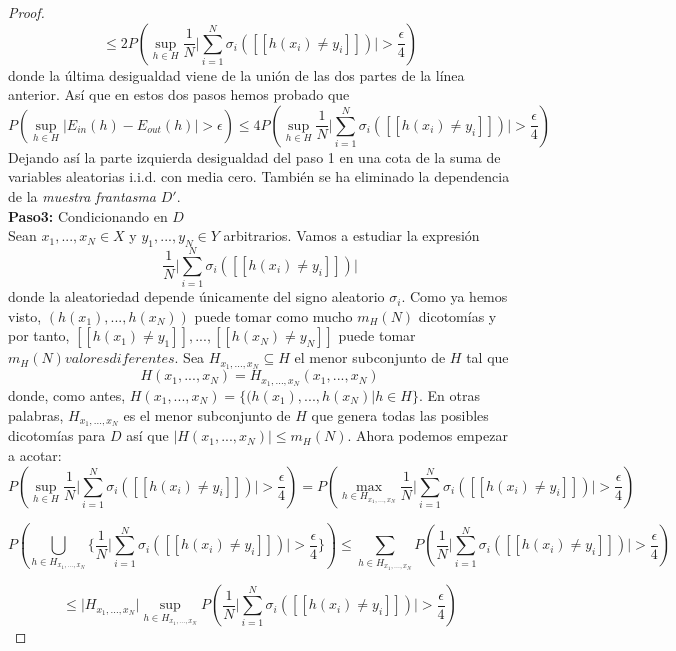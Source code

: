 \begin{proof}
\[ \leq 2P \left( \sup_{h \in H} \frac{1}{N} \bigg\vert \sum_{i=1}^{N} \sigma_{i} ( [[ h(x_{i}) \neq y_{i} ]])\bigg\vert > \frac{\epsilon}{4} \right)\]
donde la última desigualdad viene de la unión de las dos partes de la línea anterior. Así que en estos dos pasos hemos probado que
\[ P \left( \sup_{h \in H} \vert E_{in}(h)-E_{out}(h) \vert >\epsilon \right) \leq 4P \left( \sup_{h \in H} \frac{1}{N} \bigg\vert \sum_{i=1}^{N} \sigma_{i} ( [[ h(x_{i}) \neq y_{i} ]])\bigg\vert > \frac{\epsilon}{4} \right) \]
Dejando así la parte izquierda desigualdad del paso 1 en una cota de la suma de variables aleatorias i.i.d. con media cero. También se ha eliminado la dependencia de la \textit{muestra frantasma} $D'$.\\ 
\textbf{Paso3:} Condicionando en $D$\\
Sean $x_{1},...,x_{N} \in X$ y $y_{1},...,y_{N} \in Y$ arbitrarios. Vamos a estudiar la expresión
\[ \frac{1}{N} \bigg\vert \sum_{i=1}^{N} \sigma_{i} ( [[ h(x_{i}) \neq y_{i} ]])\bigg\vert \]
donde la aleatoriedad depende únicamente del signo aleatorio $\sigma_{i}$. Como ya hemos visto, $(h(x_{1}),..., h(x_{N}))$ puede tomar como mucho $m_{H}(N)$ dicotomías y por tanto, $[[ h(x_{1}) \neq y_{1} ]],...,[[ h(x_{N}) \neq y_{N} ]]$ puede tomar $m_{H}(N) valores diferentes$. Sea $H_{x_{1},...,x_{N}} \subseteq H$ el menor subconjunto de $H$ tal que
\[ H(x_{1},...,x_{N})=H_{x_{1},...,x_{N}}(x_{1},...,x_{N}) \]
donde, como antes, $H(x_{1},...,x_{N})= \lbrace (h(x_{1}),...,h(x_{N}) \vert h \in H \rbrace$. En otras palabras, $H_{x_{1},...,x_{N}}$ es el menor subconjunto de $H$ que genera todas las posibles dicotomías para $D$ así que $\vert H(x_{1},...,x_{N}) \vert \leq m_{H}(N)$. Ahora podemos empezar a acotar:\\
\[ P \left( \sup_{h \in H} \frac{1}{N} \bigg\vert \sum_{i=1}^{N} \sigma_{i} ( [[ h(x_{i}) \neq y_{i} ]])\bigg\vert > \frac{\epsilon}{4} \right) = P \left( \max_{h \in H_{x_{1},...,x_{N}}} \frac{1}{N} \bigg\vert \sum_{i=1}^{N} \sigma_{i} ( [[ h(x_{i}) \neq y_{i} ]])\bigg\vert > \frac{\epsilon}{4} \right)\]

\[ P \left( \bigcup\limits_{h \in H_{x_{1},...,x_{N}}} \bigg\lbrace \frac{1}{N} \bigg\vert \sum_{i=1}^{N} \sigma_{i} ( [[ h(x_{i}) \neq y_{i} ]])\bigg\vert > \frac{\epsilon}{4} \bigg\rbrace \right) 
\leq \sum_{h \in H_{x_{1},...,x_{N}}} P \left(  \frac{1}{N} \bigg\vert \sum_{i=1}^{N} \sigma_{i} ( [[ h(x_{i}) \neq y_{i} ]])\bigg\vert > \frac{\epsilon}{4}  \right) \]

\[ \leq \vert H_{x_{1},...,x_{N}} \vert \sup_{h \in H_{x_{1},...,x_{N}}} P \left(  \frac{1}{N} \bigg\vert \sum_{i=1}^{N} \sigma_{i} ( [[ h(x_{i}) \neq y_{i} ]])\bigg\vert > \frac{\epsilon}{4}  \right) \]


\end{proof}
